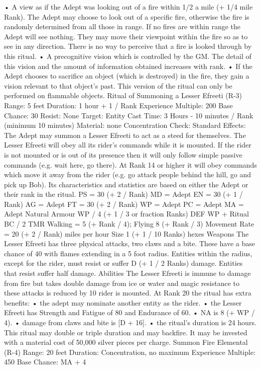 \documentclass[a4paper]{article}
\begin{document}
\begin{multicols}{3}
• A view as if the Adept was looking out of a fire
within 1/2 a mile (+ 1/4 mile Rank). The Adept
may choose to look out of a specific fire, otherwise
the fire is randomly determined from all those in
range. If no fires are within range the Adept will
see nothing. They may move their viewpoint
within the fire so as to see in any direction. There
is no way to perceive that a fire is looked through
by this ritual.
• A precognitive vision which is controlled by the
GM. The detail of this vision and the amount of
information obtained increases with rank.
• If the Adept chooses to sacrifice an object (which
is destroyed) in the fire, they gain a vision relevant
to that object’s past. This version of the ritual can
only be performed on flammable objects.
Ritual of Summoning a Lesser Efreeti (R-3)
Range: 5 feet
Duration: 1 hour + 1 / Rank
Experience Multiple: 200
Base Chance: 30%
Resist: None
Target: Entity
Cast Time: 3 Hours - 10 minutes / Rank (minimum
10 minutes)
Material: none
Concentration Check: Standard
Effects: The Adept may summon a Lesser Efreeti
to act as a steed for themselves. The Lesser Efreeti
will obey all its rider’s commands while it is
mounted. If the rider is not mounted or is out of its
presence then it will only follow simple passive
commands (e.g. wait here, go there). At Rank 14 or
higher it will obey commands which move it away
from the rider (e.g. go attack people behind the hill,
go and pick up Bob).
Its characteristics and statistics are based on either
the Adept or their rank in the ritual.
PS = 30 (+ 2 / Rank) MD = Adept
EN = 30 (+ 1 / Rank) AG = Adept
FT = 30 (+ 2 / Rank) WP = Adept
PC = Adept
MA = Adept
Natural Armour WP / 4 (+ 1 / 3 or fraction
Ranks)
DEF WP + Ritual BC / 2
TMR Walking = 5 (+ Rank / 4); Flying 8 (+ Rank /
3)
Movement Rate = 20 (+ 2 / Rank) miles per hour
Size 1 (+ 1 / 10 Ranks) hexes
Weapons The Lesser Efreeti has three physical
attacks, two claws and a bite. These have a base
chance of 40%
with flames extending in a 5 foot radius. Entities
within the radius, except for the rider, must resist
or suffer D (+ 1 / 2 Ranks) damage. Entities that
resist suffer half damage.
Abilities The Lesser Efreeti is immune to damage
from fire but takes double damage from ice or
water and magic resistance to these attacks is reduced by 10%
rider is mounted.
At Rank 20 the ritual has extra benefits:
• the adept may nominate another entity as the
rider.
• the Lesser Efreeti has Strength and Fatigue of 80
and Endurance of 60.
• NA is 8 (+ WP / 4).
• damage from claws and bite is [D + 16].
• the ritual’s duration is 24 hours.
This ritual may double or triple duration and may
backfire. It may be invested with a material cost of
50,000 silver pieces per charge.
Summon Fire Elemental (R-4)
Range: 20 feet
Duration: Concentration, no maximum
Experience Multiple: 450
Base Chance: MA + 4%


\end{multicols}
\end{document}
